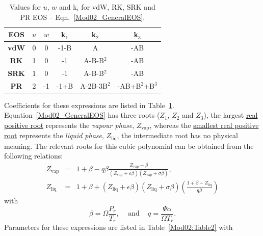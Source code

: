 \documentclass[12pts,a4paper,amsmath,amssymb,floatfix]{article}%
\newcommand{\frc}{\displaystyle\frac}
\begin{document}
\begin{enumerate}[i)]
\begin{enumerate}[a)]
\begin{table}[h]
  \begin{center}
  \begin{tabular}{ c | c c c c c }
    \hline
      {\bf EOS} & {\bf $u$} & {\bf $w$} & {\bf k$_{1}$} & {\bf k$_{2}$} & {\bf k$_{3}$} \\
    \hline
        {\bf vdW} &    0    &    0    & -1-B       &     A         & -AB         \\
        {\bf RK}  &    1    &    0    & -1         &  A-B-B$^{2}$   & -AB         \\
        {\bf SRK} &    1    &    0    & -1         &  A-B-B$^{2}$   & -AB         \\
        {\bf PR}  &    2    &   -1    & -1+B       & A-2B-3B$^{2}$  & -AB+B$^{2}$+B$^{3}$ \\
    \hline
  \end{tabular}
  \caption{Values for $u$, $w$ and k$_{i}$ for vdW, RK, SRK and PR EOS --  Eqn.~\ref{Mod02_GeneralEOS}.}\label{Mod02:Table1}
  \end{center}
\end{table}
                   Coefficients for these expressions are listed in Table~\ref{Mod02:Table1}. Equation~\ref{Mod02_GeneralEOS} has three roots ($Z_{1}$, $Z_{2}$ and $Z_{3}$), the largest \underline{real positive root} represents the {\it vapour phase}, $Z_{\text{vap}}$, whereas the \underline{smallest real positive root} represents the {\it liquid phase}, $Z_{\text{liq}}$, the intermediate root has no physical meaning. The relevant roots for this cubic polynomial can be obtained from the following relations:
                   \begin{eqnarray}
                       Z_{\text{vap}} &=& 1 + \beta - q\beta \frc{Z_{\text{vap}} - \beta} {\left(Z_{\text{vap}}+\varepsilon\beta\right)\left(Z_{\text{vap}} +\sigma\beta\right)},\label{Mod02_Zvap} \\
                       Z_{\text{liq}} &=& 1 + \beta + \left(Z_{\text{liq}} + \epsilon\beta\right)\left(Z_{\text{liq}}+\sigma\beta\right)\left(\frc{1+\beta-Z_{\text{liq}}}{q\beta}\right)\label{Mod02_Zliq}
                   \end{eqnarray}
                   with 
                   \begin{displaymath}
                      \beta=\Omega\frc{P_{r}}{T_{r}},\;\;\; \text{ and }\;\;\; q=\frc{\Psi\alpha}{\Omega T_{r}}.
                   \end{displaymath}
                   Parameters for these expressions are listed in Table~\ref{Mod02:Table2} with

\end{enumerate}
\end{enumerate}
\end{document}
